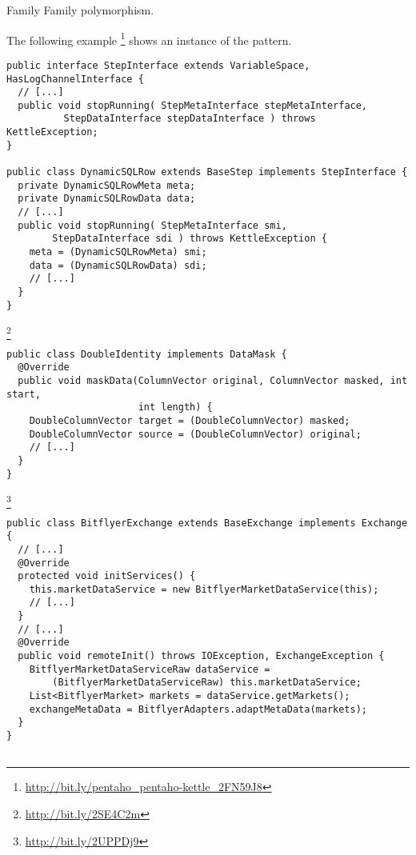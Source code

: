\begin{pattern}{Family}
Family polymorphism.

\instances{}
The following example%
\footnote{\url{http://bit.ly/pentaho_pentaho-kettle_2FN59J8}}
%
%
shows an instance of the \thisp{} pattern.

\begin{verbatim}
public interface StepInterface extends VariableSpace, HasLogChannelInterface {
  // [...]
  public void stopRunning( StepMetaInterface stepMetaInterface,
          StepDataInterface stepDataInterface ) throws KettleException;
}

public class DynamicSQLRow extends BaseStep implements StepInterface {
  private DynamicSQLRowMeta meta;
  private DynamicSQLRowData data;
  // [...]
  public void stopRunning( StepMetaInterface smi,
        StepDataInterface sdi ) throws KettleException {
    meta = (DynamicSQLRowMeta) smi;
    data = (DynamicSQLRowData) sdi;
    // [...]
  }
}
\end{verbatim}

\footnote{\url{http://bit.ly/2SE4C2m}}

\begin{verbatim}
public class DoubleIdentity implements DataMask {
  @Override
  public void maskData(ColumnVector original, ColumnVector masked, int start,
                       int length) {
    DoubleColumnVector target = (DoubleColumnVector) masked;
    DoubleColumnVector source = (DoubleColumnVector) original;
    // [...]
  }
}
\end{verbatim}

\footnote{\url{http://bit.ly/2UPPDj9}}

\begin{verbatim}
public class BitflyerExchange extends BaseExchange implements Exchange {
  // [...]
  @Override
  protected void initServices() {
    this.marketDataService = new BitflyerMarketDataService(this);
    // [...]
  }
  // [...]
  @Override
  public void remoteInit() throws IOException, ExchangeException {
    BitflyerMarketDataServiceRaw dataService =
        (BitflyerMarketDataServiceRaw) this.marketDataService;
    List<BitflyerMarket> markets = dataService.getMarkets();
    exchangeMetaData = BitflyerAdapters.adaptMetaData(markets);
  }
}


\end{verbatim}
\end{pattern}
